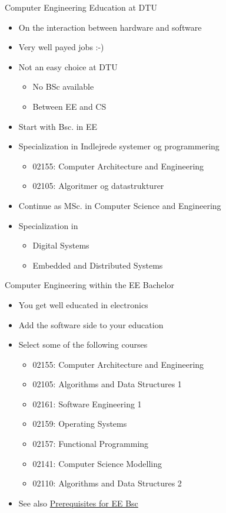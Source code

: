 \begin{frame}[fragile]{Computer Engineering Education at DTU}
\begin{itemize}
\item On the interaction between hardware and software
\item Very well payed jobs :-)
\item Not an easy choice at DTU
\begin{itemize}
\item No BSc available
\item Between EE and CS
\end{itemize}
\item Start with Bsc. in EE
\item Specialization in Indlejrede systemer og programmering
\begin{itemize}
\item 02155: Computer Architecture and Engineering
\item 02105: Algoritmer og datastrukturer
\end{itemize}
\item Continue as MSc. in Computer Science and Engineering
\item Specialization in
\begin{itemize}
\item Digital Systems
\item Embedded and Distributed Systems
\end{itemize}
\end{itemize}
\end{frame}

\begin{frame}[fragile]{Computer Engineering within the EE Bachelor}
\begin{itemize}
\item You get well educated in electronics
\item Add the software side to your education
\item Select some of the following courses
\begin{itemize}
\item 02155: Computer Architecture and Engineering
\item 02105: Algorithms and Data Structures 1
\item 02161: Software Engineering 1
\item 02159: Operating Systems
\item 02157: Functional Programming
\item 02141: Computer Science Modelling
\item 02110: Algorithms and Data Structures 2
\end{itemize}
\item See also \href{https://www.dtu.dk/da/english/Education/msc/Programmes/computer_science_and_engineering/Prerequisites}{Prerequisites for EE Bsc}
\end{itemize}
\end{frame}

